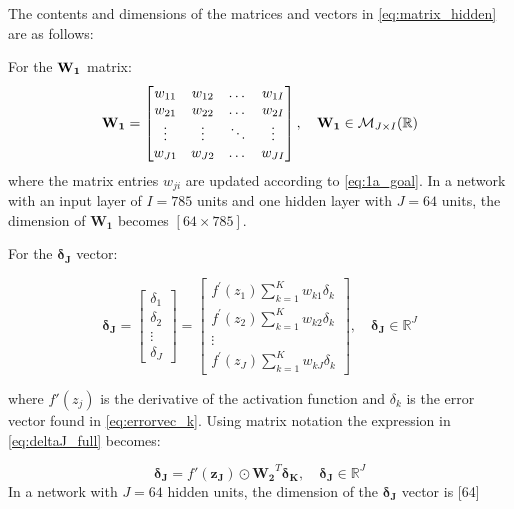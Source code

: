 \documentclass{article}
\begin{document}
The contents and dimensions of the matrices and vectors in \eqref{eq:matrix_hidden} are as follows: 

For the $\text{\textbf{W}}_\textbf{1}$ matrix:
\begin{equation}
    \text{\textbf{W}}_\textbf{1} =
    \begin{bmatrix}
        w_{11} & w_{12}& \dots & w_{1I} \\
         w_{21} & w_{22}& \dots & w_{2I} \\
        \vdots & \vdots & \ddots & \vdots \\
         w_{J1} & w_{J2}& \dots & w_{JI} \\
    \end{bmatrix}
    , \quad \text{\textbf{W}}_\textbf{1} \in \mathcal{M}_{J \times I}(\mathbb{R})
\end{equation}
where the matrix entries $w_{ji}$ are updated according to \eqref{eq:1a_goal}. In a network with an input layer of $I = 785$ units and one hidden layer with $J = 64$ units, the dimension of $\mathbf{W_1}$ becomes $[64 \times 785]$.

For the $\boldsymbol{\delta_J}$ vector:

\begin{equation}
    \boldsymbol{\delta_J} = 
    \begin{bmatrix}
        \delta_1 \\
        \delta_2 \\
        \vdots \\
        \delta_J
    \end{bmatrix}
    = \begin{bmatrix}
        f^{\prime}\left(z_{1}\right) \sum_{k=1}^K w_{k 1} \delta_{k} \\
        f^{\prime}\left(z_{2}\right) \sum_{k=1}^K w_{k 2} \delta_{k} \\
        \vdots \\
        f^{\prime}\left(z_{J}\right) \sum_{k=1}^K w_{k J} \delta_{k}
    \end{bmatrix}
    , \quad \boldsymbol{\delta_J} \in \mathbb{R}^J
    \label{eq:deltaJ_full}
\end{equation}

where $f'(z_j)$ is the derivative of the activation function and $\delta_k$ is the error vector found in \ref{eq:errorvec_k}. Using matrix notation the expression in \eqref{eq:deltaJ_full} becomes:

\begin{equation}
    \boldsymbol{\delta_J} = f'(\boldsymbol{z_J}) \odot \mathbf{W_2}^T \boldsymbol{\delta_K}, \quad \boldsymbol{\delta_J} \in \mathbb{R}^J
\end{equation}
In a network with $J = 64$ hidden units, the dimension of the $\boldsymbol{\delta_J}$ vector is [64]
\end{document}
